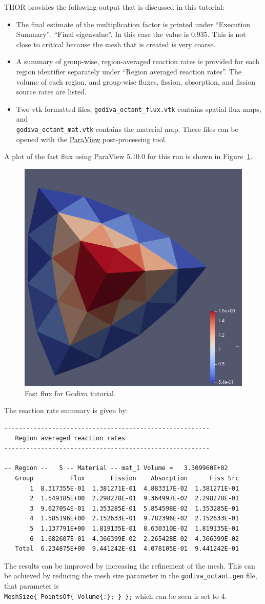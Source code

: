 \ac{THOR} provides the following output that is discussed in this tutorial:
\begin{itemize}
    \item The final estimate of the multiplication factor is printed under ``Execution Summary'', ``Final eigenvalue''.
    In this case the value is $0.935$. This is not close to critical because the mesh that
    is created is very coarse.
    \item A summary of group-wise, region-averaged reaction rates is provided for each region identifier separately under ``Region averaged reaction rates''.
    The volume of each region, and group-wise fluxes, fission, absorption, and fission source rates are listed.
    \item Two vtk formatted files, \verb"godiva_octant_flux.vtk" contains spatial flux maps, and \\
    \verb"godiva_octant_mat.vtk" contains the material map. These files can be opened with the \href{https://www.paraview.org/download/}{ParaView} post-processing tool.
\end{itemize}

A plot of the fast flux using ParaView 5.10.0 for this run is shown in Figure~\ref{fig:godiva_fast}.
\begin{figure}[th]
  \center
  \includegraphics[height=0.5\textwidth]{chapters/tutorials/figures/godiva_fast.png}
  \caption{Fast flux for Godiva tutorial.}
  \label{fig:godiva_fast}
\end{figure}

The reaction rate summary is given by:
\begin{verbatim}
--------------------------------------------------------
   Region averaged reaction rates
--------------------------------------------------------

-- Region --   5 -- Material -- mat_1 Volume =   3.309960E+02
   Group          Flux       Fission    Absorption      Fiss Src
       1  8.317355E-01  1.381271E-01  4.883317E-02  1.381271E-01
       2  1.549185E+00  2.298278E-01  9.364997E-02  2.298278E-01
       3  9.627054E-01  1.353285E-01  5.854598E-02  1.353285E-01
       4  1.585196E+00  2.152633E-01  9.782396E-02  2.152633E-01
       5  1.137791E+00  1.819135E-01  8.630310E-02  1.819135E-01
       6  1.682607E-01  4.366399E-02  2.265428E-02  4.366399E-02
   Total  6.234875E+00  9.441242E-01  4.078105E-01  9.441242E-01
\end{verbatim}

The results can be improved by increasing the refinement of the mesh.
This can be achieved by reducing the mesh size parameter in the \verb"godiva_octant.geo" file, that parameter is \\
\verb"MeshSize{ PointsOf{ Volume{:}; } };" which can be seen is set to 4.